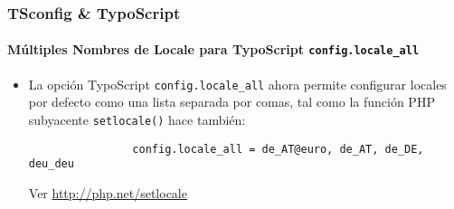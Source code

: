 \begin{frame}[fragile]
	\frametitle{TSconfig \& TypoScript}
	\framesubtitle{Múltiples Nombres de Locale para TypoScript \texttt{config.locale\_all}}

	\lstset{basicstyle=\small\ttfamily}

	\begin{itemize}

		\item La opción TypoScript \texttt{config.locale\_all} ahora permite
			configurar locales por defecto como una lista separada por comas, tal como la función PHP
			subyacente \texttt{setlocale()} hace también:

			\begin{lstlisting}
				config.locale_all = de_AT@euro, de_AT, de_DE, deu_deu
			\end{lstlisting}

			Ver \url{http://php.net/setlocale}

	\end{itemize}

\end{frame}

